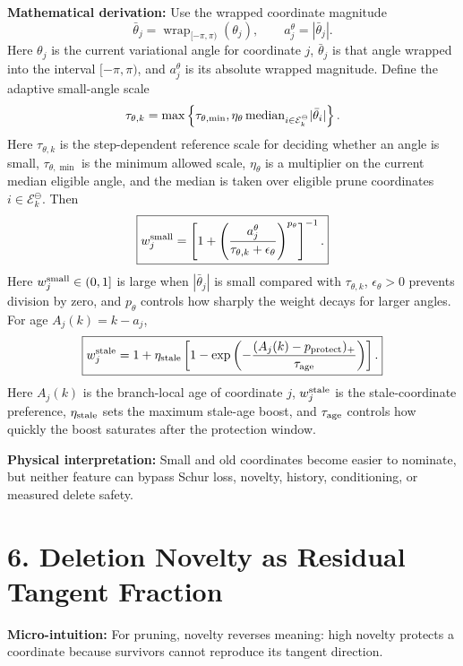 \documentclass[10pt,twocolumn]{article}
\newcommand{\blk}[1]{\vspace{3pt}\noindent\textbf{#1:}\quad}
\newcommand{\Edel}{\mathcal E_k^{\ominus}}
\begin{document}
\blk{Mathematical derivation}
Use the wrapped coordinate magnitude
\[
\bar\theta_j=\operatorname{wrap}_{[-\pi,\pi)}(\theta_j),
\qquad
a_j^\theta=|\bar\theta_j|.
\]
Here \(\theta_j\) is the current variational angle for coordinate \(j\), \(\bar\theta_j\) is that angle wrapped into the interval \([-\pi,\pi)\), and \(a_j^\theta\) is its absolute wrapped magnitude.
Define the adaptive small-angle scale
\[
\tau_{\theta,k}
=
\max\left\{
\tau_{\theta,\min},
\eta_\theta\,{\rm median}_{i\in\Edel}|\bar\theta_i|
\right\}.
\]
Here \(\tau_{\theta,k}\) is the step-dependent reference scale for deciding whether an angle is small, \(\tau_{\theta,\min}\) is the minimum allowed scale, \(\eta_\theta\) is a multiplier on the current median eligible angle, and the median is taken over eligible prune coordinates \(i\in\Edel\).
Then
\[
\boxed{
w_j^{\rm small}
=
\left[
1+
\left(
\frac{a_j^\theta}{\tau_{\theta,k}+\epsilon_\theta}
\right)^{p_\theta}
\right]^{-1}.
}
\]
Here \(w_j^{\rm small}\in(0,1]\) is large when \(|\bar\theta_j|\) is small compared with \(\tau_{\theta,k}\), \(\epsilon_\theta>0\) prevents division by zero, and \(p_\theta\) controls how sharply the weight decays for larger angles.
For age \(A_j(k)=k-a_j\),
\[
\boxed{
w_j^{\rm stale}
=
1+\eta_{\rm stale}
\left[
1-\exp\left(
-\frac{(A_j(k)-p_{\rm protect})_+}{\tau_{\rm age}}
\right)
\right].
}
\]
Here \(A_j(k)\) is the branch-local age of coordinate \(j\), \(w_j^{\rm stale}\) is the stale-coordinate preference, \(\eta_{\rm stale}\) sets the maximum stale-age boost, and \(\tau_{\rm age}\) controls how quickly the boost saturates after the protection window.

\blk{Physical interpretation}
Small and old coordinates become easier to nominate, but neither feature can bypass Schur loss, novelty, history, conditioning, or measured delete safety.

\section*{6. Deletion Novelty as Residual Tangent Fraction}

\blk{Micro-intuition}
For pruning, novelty reverses meaning: high novelty protects a coordinate because survivors cannot reproduce its tangent direction.
\end{document}

